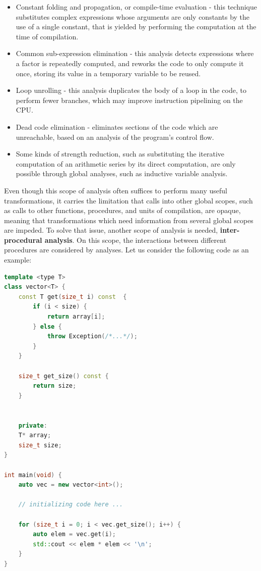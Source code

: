 \begin{itemize}
    \item Constant folding and propagation, or compile-time evaluation - this technique substitutes complex expressions whose arguments are only constants by the use of a single constant, that is yielded by performing the computation at the time of compilation.
    \item Common sub-expression elimination - this analysis detects expressions where a factor is repeatedly computed, and reworks the code to only compute it once, storing its value in a temporary variable to be reused.
    \item Loop unrolling - this analysis duplicates the body of a loop in the code, to perform fewer branches, which may improve instruction pipelining on the CPU.
    \item Dead code elimination - eliminates sections of the code which are unreachable, based on an analysis of the program's control flow.
    \item Some kinds of strength reduction, such as substituting the iterative computation of an arithmetic series by its direct computation, are only possible through global analyses, such as inductive variable analysis.
\end{itemize}

Even though this scope of analysis often suffices to perform many useful transformations, it carries the limitation that calls into other global scopes, such as calls to other functions, procedures, and units of compilation, are opaque, meaning that transformations which need information from several global scopes are impeded. To solve that issue, another scope of analysis is needed, \textbf{inter-procedural analysis}. On this scope, the interactions between different procedures are considered by analyses. Let us consider the following code as an example:

\begin{lstlisting}[language=C++]
template <type T>
class vector<T> {
    const T get(size_t i) const  {
        if (i < size) {
            return array[i];
        } else {
            throw Exception(/*...*/);
        }
    }

    size_t get_size() const {
        return size;
    }


    private:
    T* array;
    size_t size;
}

int main(void) {
    auto vec = new vector<int>();

    // initializing code here ...

    for (size_t i = 0; i < vec.get_size(); i++) {
        auto elem = vec.get(i);
        std::cout << elem * elem << '\n';
    }
}
\end{lstlisting}

